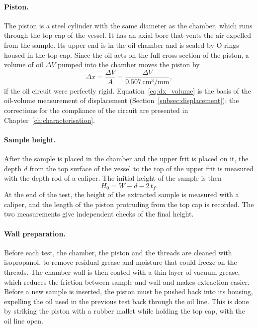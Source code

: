 \paragraph{Piston.} The piston is a steel cylinder with the same diameter as the chamber, which runs through the top cap of the vessel. It has an axial bore that vents the air expelled from the sample. Its upper end is in the oil chamber and is sealed by O-rings housed in the top cap. Since the oil acts on the full cross-section of the piston, a volume of oil $\Delta V$ pumped into the chamber moves the piston by
\begin{equation}
    \Delta x = \frac{\Delta V}{A} = \frac{\Delta V}{0.507\,\mathrm{cm^3/mm}},
    \label{eq:dx_volume}
\end{equation}
if the oil circuit were perfectly rigid. Equation~\eqref{eq:dx_volume} is the basis of the oil-volume measurement of displacement (Section~\ref{subsec:displacement}); the corrections for the compliance of the circuit are presented in Chapter~\ref{ch:characterisation}.

\paragraph{Sample height.} After the sample is placed in the chamber and the upper frit is placed on it, the depth $d$ from the top surface of the vessel to the top of the upper frit is measured with the depth rod of a caliper. The initial height of the sample is then
\begin{equation}
    H_0 = W - d - 2\,t_f.
    \label{eq:H0}
\end{equation}
At the end of the test, the height of the extracted sample is measured with a caliper, and the length of the piston protruding from the top cap is recorded. The two measurements give independent checks of the final height.

\paragraph{Wall preparation.} Before each test, the chamber, the piston and the threads are cleaned with isopropanol, to remove residual grease and moisture that could freeze on the threads. The chamber wall is then coated with a thin layer of vacuum grease, which reduces the friction between sample and wall and makes extraction easier. Before a new sample is inserted, the piston must be pushed back into its housing, expelling the oil used in the previous test back through the oil line. This is done by striking the piston with a rubber mallet while holding the top cap, with the oil line open.


